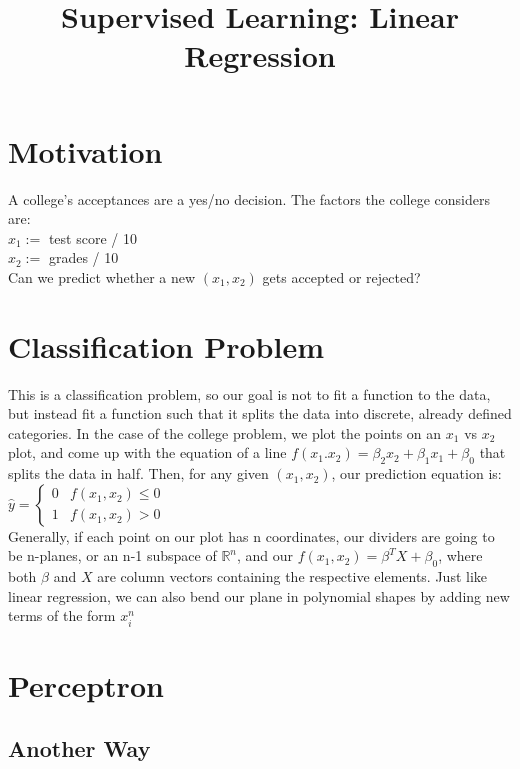 \documentclass{article}
\title{Supervised Learning: Linear Regression}
\begin{document}
\maketitle
\section{Motivation}
A college's acceptances are a yes/no decision. The factors the college considers are:\\
$x_1:=$ test score / 10\\
$x_2:=$ grades / 10\\

Can we predict whether a new $(x_1, x_2)$ gets accepted or rejected?

\section{Classification Problem}
This is a classification problem, so our goal is not to fit a function to the data, but instead fit a function such that it splits the data into discrete, already defined categories. In the case of the college problem, we plot the points on an $x_1$ vs $x_2$ plot, and come up with the equation of a line $f(x_1.x_2) = \beta_2 x_2 + \beta_1 x_1 + \beta_0$ that splits the data in half. Then, for any given $(x_1,x_2)$, our prediction equation is: \\
$\hat{y} = 
\begin{cases} 
0 & f(x_1, x_2) \le 0 \\
1 & f(x_1, x_2) > 0 
\end{cases}
$\\
Generally, if each point on our plot has n coordinates, our dividers are going to be n-planes, or an n-1 subspace of $\mathbb{R}^n$, and our $f(x_1, x_2) = \beta^T X + \beta_0$, where both $\beta$ and $X$ are column vectors containing the respective elements. Just like linear regression, we can also bend our plane in polynomial shapes by adding new terms of the form $x_{i}^n$
\section{Perceptron}

\subsection{Another Way}
\end{document}
